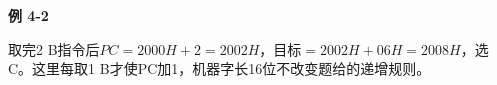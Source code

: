 {\color{ink}\bfseries 例 4-2}\par\vspace{1bp}取完2 B指令后\(PC=\allowbreak{}2000H+\allowbreak{}2=\allowbreak{}2002H\)，目标\(=\allowbreak{}2002H+\allowbreak{}06H=\allowbreak{}2008H\)，选C。这里每取1 B才使PC加1，机器字长16位不改变题给的递增规则。
